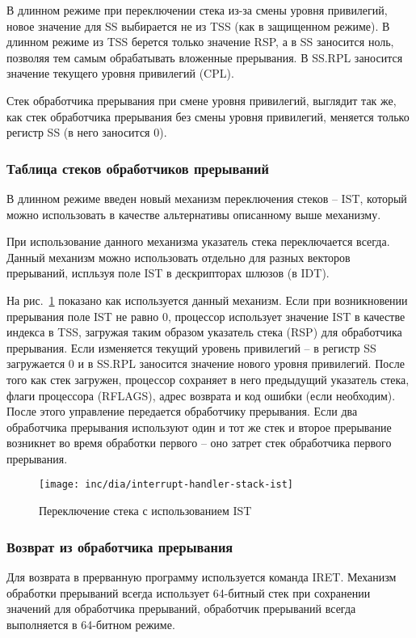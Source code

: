 В длинном режиме при переключении стека из-за смены уровня привилегий,
новое значение для SS выбирается не из TSS (как в защищенном режиме). В
длинном режиме из TSS берется только значение RSP, а в SS заносится ноль,
позволяя тем самым обрабатывать вложенные прерывания. В SS.RPL заносится
значение текущего уровня привилегий (CPL).

Стек обработчика прерывания при смене уровня привилегий, выглядит так же, как
стек обработчика прерывания без смены уровня привилегий, меняется только
регистр SS (в него заносится 0).

\subsubsection*{Таблица стеков обработчиков прерываний}
В длинном режиме введен новый механизм переключения стеков -- IST, который
можно использовать в качестве альтернативы описанному выше механизму.

При использование данного механизма указатель стека переключается всегда. Данный механизм
можно использовать отдельно для разных векторов прерываний, испльзуя поле IST
в дескрипторах шлюзов (в IDT).

На рис.~\ref{fig:interrupt_handler_stack_ist} показано как используется данный
механизм. Если при возникновении прерывания поле IST не равно 0, процессор
использует значение IST в качестве индекса в TSS, загружая таким образом указатель стека
(RSP) для обработчика прерывания. Если изменяется текущий уровень привилегий
-- в регистр SS загружается 0 и в SS.RPL заносится значение нового уровня
привилегий. После того как стек загружен, процессор сохраняет в него предыдущий
указатель стека, флаги процессора (RFLAGS), адрес возврата и код ошибки (если
необходим). После этого управление передается обработчику прерывания. Если два
обработчика прерывания используют один и тот же стек и второе прерывание
возникнет во время обработки первого -- оно затрет стек обработчика первого прерывания.

\begin{figure}[ht!]
  \centering
  \texttt{[image: inc/dia/interrupt-handler-stack-ist]}
  \caption{Переключение стека с использованием IST}
  \label{fig:interrupt_handler_stack_ist}
\end{figure}

\subsubsection*{Возврат из обработчика прерывания}
Для возврата в прерванную программу используется команда IRET. Механизм
обработки прерываний всегда использует 64-битный стек при сохранении значений
для обработчика прерываний, обработчик прерываний всегда выполняется в
64-битном режиме.

